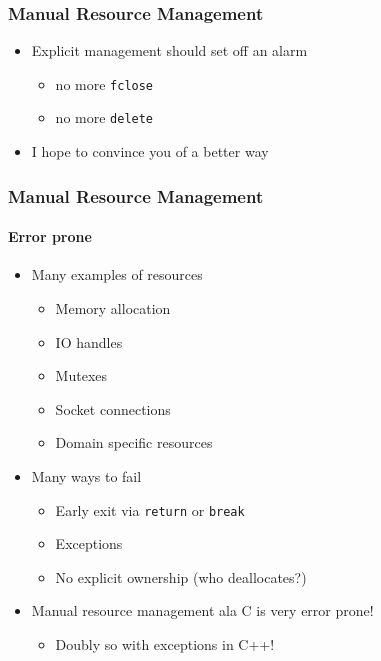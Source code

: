 \begin{frame}[fragile]
    \frametitle{Manual Resource Management}
    \begin{itemize}
        \item Explicit management should set off an alarm
            \begin{itemize}
                \item no more \texttt{fclose}
                \item no more \texttt{delete}
            \end{itemize}
        \item I hope to convince you of a better way
    \end{itemize}
\end{frame}

\begin{frame}
    \frametitle{Manual Resource Management}
    \framesubtitle{Error prone}
    \begin{itemize}
        \item Many examples of resources
            \begin{itemize}
                \item Memory allocation
                \item IO handles
                \item Mutexes
                \item Socket connections
                \item Domain specific resources
            \end{itemize}
        \item Many ways to fail
            \begin{itemize}
                \item Early exit via \texttt{return} or \texttt{break}
                \item Exceptions
                \item No explicit ownership (who deallocates?)
            \end{itemize}
        \item Manual resource management ala C is very error prone!
            \begin{itemize}
                \item Doubly so with exceptions in C++!
            \end{itemize}
    \end{itemize}
\end{frame}


